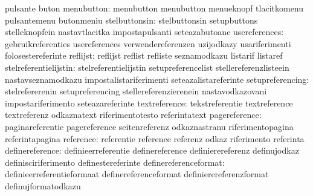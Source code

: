                                   pulsante                         buton
                      menubutton: menubutton                       menubutton
                                  menueknopf                       tlacitkomenu
                                  pulsantemenu                     butonmeniu
                   stelbuttonsin: stelbuttonsin                    setupbuttons
                                  stelleknopfein                   nastavtlacitka
                                  impostapulsanti                  seteazabutoane
                   usereferences: gebruikreferenties               usereferences
                                  verwendereferenzen               uzijodkazy
                                  usariferimenti                   folosestereferinte
                        reflijst: reflijst                         reflist
                                  refliste                         seznamodkazu
                                  listarif                         listaref
           stelreferentielijstin: stelreferentielijstin            setupreferencelist
                                  stellereferenzlisteein           nastavseznamodkazu
                                  impostalistariferimenti          seteazalistareferinte
                setupreferencing: stelrefererenin                  setupreferencing
                                  stellereferenzierenein           nastavodkazovani
                                  impostariferimento               seteazareferinte
                   textreference: tekstreferentie                  textreference
                                  textreferenz                     odkaznatext
                                  riferimentotesto                 referintatext
                   pagereference: paginareferentie                 pagereference
                                  seitenreferenz                   odkaznastranu
                                  riferimentopagina                referintapagina
                       reference: referentie                       reference
                                  referenz                         odkaz
                                  riferimento                      referinta
                 definereference: definieerreferentie              definereference
                                  definierereferenz                definujodkaz
                                  definisciriferimento             definestereferinte
           definereferenceformat: definieerreferentieformaat       definereferenceformat
                                  definierereferenzformat          definujformatodkazu
